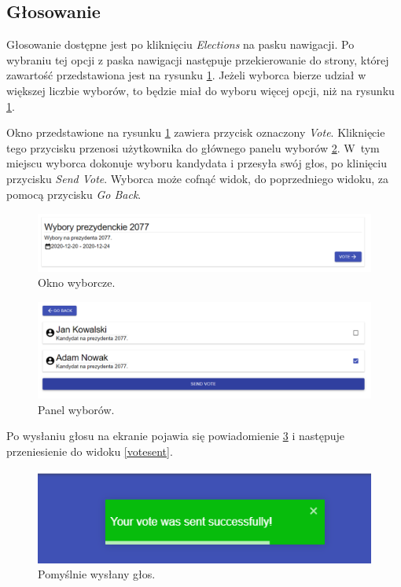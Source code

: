 \documentclass[a4paper,12pt]{book}
\begin{document}
\newpage

\subsection{Głosowanie}

Głosowanie dostępne jest po kliknięciu \textit{Elections} na pasku nawigacji. Po wybraniu tej opcji z paska nawigacji następuje przekierowanie do strony, której zawartość przedstawiona jest na rysunku \ref{electionwindow}. Jeżeli wyborca bierze udział w większej liczbie wyborów, to będzie miał do wyboru więcej opcji, niż na rysunku \ref{electionwindow}.

Okno  przedstawione na rysunku \ref{electionwindow} zawiera przycisk oznaczony \textit{Vote}. Kliknięcie tego przycisku przenosi użytkownika do głównego panelu wyborów \ref{votescreen}. W~tym miejscu wyborca dokonuje wyboru kandydata i przesyła swój głos, po klinięciu przycisku \textit{Send Vote}. Wyborca może cofnąć widok, do poprzedniego widoku, za pomocą przycisku \textit{Go Back}.

\begin{figure}[H]
	\centering
	\includegraphics[width=\textwidth]{images/electionwindow.png}
	\caption{Okno wyborcze.}\label{electionwindow}
\end {figure}

\begin{figure}[H]
	\centering
	\includegraphics[width=\textwidth]{images/votescreen.png}
	\caption{Panel wyborów.}\label{votescreen}
\end {figure}

Po wysłaniu głosu na ekranie pojawia się powiadomienie \ref{votesuccess} i następuje przeniesienie do widoku \ref{votesent}.

\begin{figure}[H]
	\centering
	\includegraphics{images/votesuccess.png}
	\caption{Pomyślnie wysłany głos.}\label{votesuccess}
\end {figure}
\end{document}
